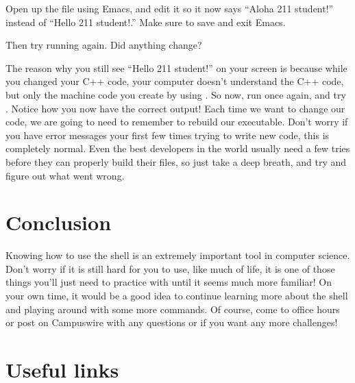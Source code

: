 \documentclass{tufte-handout}
\begin{document}
Open up the  file using Emacs, and edit it so it
now says ``Aloha 211 student!'' instead of ``Hello 211 student!.'' Make
sure to save and exit Emacs.

Then try running  again. Did anything change?

The reason why you still see ``Hello 211 student!'' on your screen is
because while you changed your C++ code, your computer doesn't
understand the C++ code, but only the machine code you create by using
.  So now, run  once again, and
try . Notice how you now have the correct output!
Each time we want to change our code, we are going to need to remember
to rebuild our executable. Don't worry if you have error messages your
first few times trying to write new code, this is completely normal.
Even the best developers in the world usually need a few tries before
they can properly build their files, so just take a deep breath, and try
and figure out what went wrong.

\section{Conclusion}

Knowing how to use the shell is an extremely important tool in computer
science. Don't worry if it is still hard for you to use, like much of
life, it is one of those things you'll just need to practice with until
it seems much more familiar!  On your own time, it would be a good idea
to continue learning more about the shell and playing around with some
more commands.
Of course, come to office hours or post on Campuswire with any questions or
if you want any more challenges!

\section{Useful links}
\end{document}
